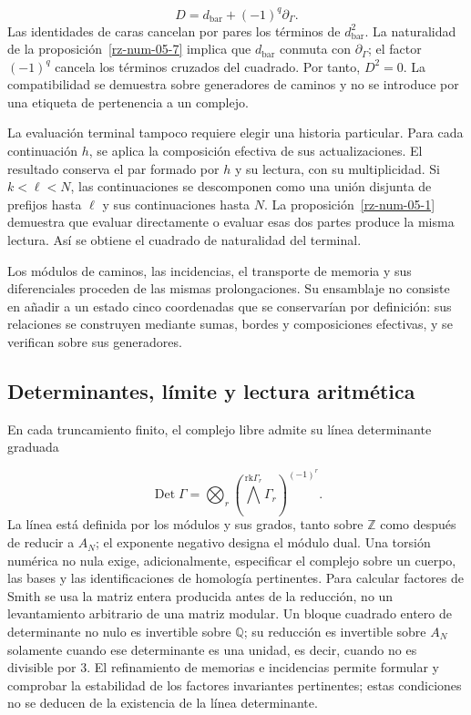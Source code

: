 \[
D=d_{\mathrm{bar}}+(-1)^q\partial_\Gamma.
\]
Las identidades de caras cancelan por pares los términos de \(d_{\mathrm{bar}}^2\). La naturalidad de la proposición~\ref{rz-num-05-7} implica que \(d_{\mathrm{bar}}\) conmuta con \(\partial_\Gamma\); el factor \((-1)^q\) cancela los términos cruzados del cuadrado. Por tanto, \(D^2=0\). La compatibilidad se demuestra sobre generadores de caminos y no se introduce por una etiqueta de pertenencia a un complejo.

La evaluación terminal tampoco requiere elegir una historia particular. Para cada continuación \(h\), se aplica la composición efectiva de sus actualizaciones. El resultado conserva el par formado por \(h\) y su lectura, con su multiplicidad. Si \(k<\ell<N\), las continuaciones se descomponen como una unión disjunta de prefijos hasta \(\ell\) y sus continuaciones hasta \(N\). La proposición~\ref{rz-num-05-1} demuestra que evaluar directamente o evaluar esas dos partes produce la misma lectura. Así se obtiene el cuadrado de naturalidad del terminal.

Los módulos de caminos, las incidencias, el transporte de memoria y sus diferenciales proceden de las mismas prolongaciones. Su ensamblaje no consiste en añadir a un estado cinco coordenadas que se conservarían por definición: sus relaciones se construyen mediante sumas, bordes y composiciones efectivas, y se verifican sobre sus generadores.

\subsection{Determinantes, límite y lectura aritmética}
En cada truncamiento finito, el complejo libre admite su línea determinante graduada

\[
\operatorname{Det}\Gamma=
\bigotimes_r\left(\bigwedge^{\mathrm{rk}\Gamma_r}\Gamma_r\right)^{(-1)^r}.
\]
La línea está definida por los módulos y sus grados, tanto sobre \(\mathbb Z\) como después de reducir a \(A_N\); el exponente negativo designa el módulo dual. Una torsión numérica no nula exige, adicionalmente, especificar el complejo sobre un cuerpo, las bases y las identificaciones de homología pertinentes. Para calcular factores de Smith se usa la matriz entera producida antes de la reducción, no un levantamiento arbitrario de una matriz modular. Un bloque cuadrado entero de determinante no nulo es invertible sobre \(\mathbb Q\); su reducción es invertible sobre \(A_N\) solamente cuando ese determinante es una unidad, es decir, cuando no es divisible por \(3\). El refinamiento de memorias e incidencias permite formular y comprobar la estabilidad de los factores invariantes pertinentes; estas condiciones no se deducen de la existencia de la línea determinante.

